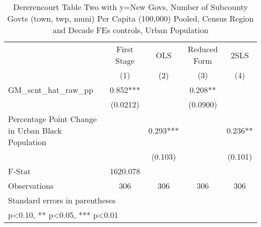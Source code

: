 \begin{table}[htbp]\centering
\def\sym#1{\ifmmode^{#1}\else\(^{#1}\)\fi}
\caption{Dererencourt Table Two with y=New Govs, Number of Subcounty Govts (town, twp, muni) Per Capita (100,000) Pooled, Census Region and Decade FEs controls, Urban Population}
\begin{tabular}{l*{4}{c}}
\toprule
                    & First Stage   &         OLS   &Reduced Form   &        2SLS   \\
                    &\multicolumn{1}{c}{(1)}   &\multicolumn{1}{c}{(2)}   &\multicolumn{1}{c}{(3)}   &\multicolumn{1}{c}{(4)}   \\
\midrule
GM\_scnt\_hat\_raw\_pp  &       0.852***&               &       0.208** &               \\
                    &    (0.0212)   &               &    (0.0900)   &               \\
\addlinespace
Percentage Point Change in Urban Black Population&               &       0.293***&               &       0.236** \\
                    &               &     (0.103)   &               &     (0.101)   \\
\midrule
F-Stat              &    1620.078   &               &               &               \\
Observations        &         306   &         306   &         306   &         306   \\
\bottomrule
\multicolumn{5}{l}{\footnotesize Standard errors in parentheses}\\
\multicolumn{5}{l}{\footnotesize * p<0.10, ** p<0.05, *** p<0.01}\\
\end{tabular}
\end{table}

